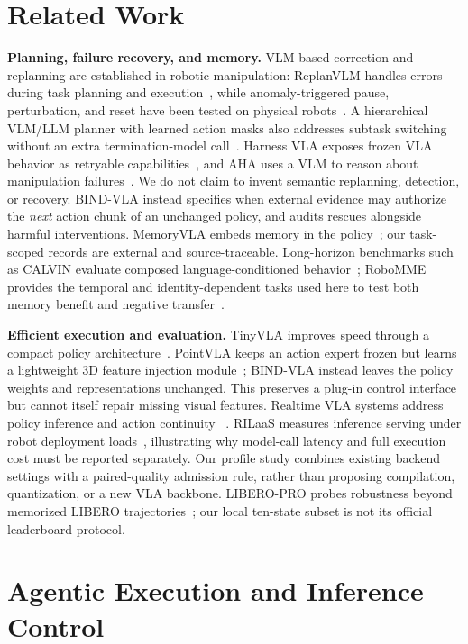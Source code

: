 \documentclass[letterpaper,10pt,conference]{ieeeconf}
\begin{document}
\section{Related Work}
\textbf{Planning, failure recovery, and memory.}
VLM-based correction and replanning are established in robotic manipulation:
ReplanVLM handles errors during task planning and execution~\cite{replanvlm},
while anomaly-triggered pause, perturbation, and reset have been tested on
physical robots~\cite{santhanam2026}. A hierarchical VLM/LLM planner with
learned action masks also addresses subtask switching without an extra
termination-model call~\cite{gu2026}. Harness VLA exposes frozen VLA behavior
as retryable capabilities~\cite{harnessvla}, and AHA uses a VLM to reason
about manipulation failures~\cite{aha}. We do not claim to invent semantic
replanning, detection, or recovery. BIND-VLA instead specifies when external
evidence may authorize the \emph{next} action chunk of an unchanged policy,
and audits rescues alongside harmful interventions. MemoryVLA embeds memory
in the policy~\cite{memoryvla}; our task-scoped records are external and
source-traceable. Long-horizon benchmarks such as CALVIN evaluate composed
language-conditioned behavior~\cite{calvin}; RoboMME provides the temporal
and identity-dependent tasks used here to test both memory benefit and
negative transfer~\cite{robomme}.

\textbf{Efficient execution and evaluation.}
TinyVLA improves speed through a compact policy architecture~\cite{tinyvla}.
PointVLA keeps an action expert frozen but learns a lightweight 3D feature
injection module~\cite{pointvla}; BIND-VLA instead leaves the policy weights
and representations unchanged. This preserves a plug-in control interface
but cannot itself repair missing visual features. Realtime VLA systems
address policy inference and action continuity
~\cite{realtimevla,realtimevlav2,realtimeflash}. RILaaS measures inference
serving under robot deployment loads~\cite{rilaas}, illustrating why
model-call latency and full execution cost must be reported separately.
Our profile study combines existing backend settings with a paired-quality
admission rule, rather than proposing compilation, quantization, or a new
VLA backbone. LIBERO-PRO probes robustness beyond memorized LIBERO
trajectories~\cite{liberopro}; our local ten-state subset is not its official
leaderboard protocol.

\section{Agentic Execution and Inference Control}
\label{sec:method}
\end{document}
